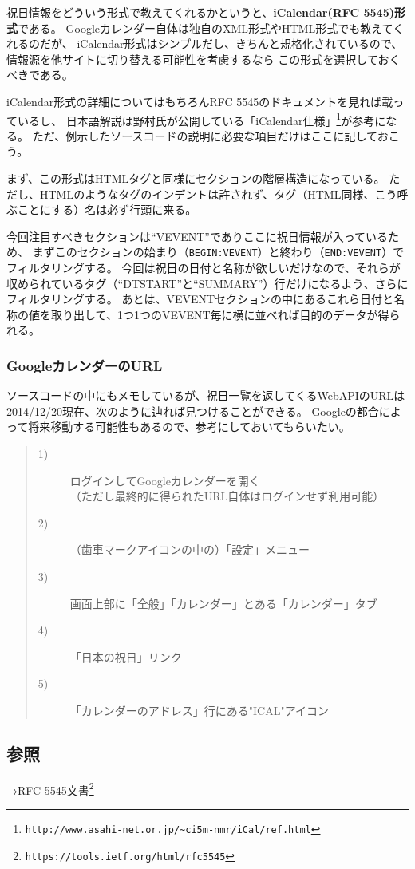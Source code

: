 祝日情報をどういう形式で教えてくれるかというと、\textbf{iCalendar(RFC 5545)形式}である。
Googleカレンダー自体は独自のXML形式やHTML形式でも教えてくれるのだが、
iCalendar形式はシンプルだし、きちんと規格化されているので、情報源を他サイトに切り替える可能性を考慮するなら
この形式を選択しておくべきである。

iCalendar形式の詳細についてはもちろんRFC 5545のドキュメントを見れば載っているし、
日本語解説は野村氏が公開している「iCalendar仕様」\footnote{\verb|http://www.asahi-net.or.jp/~ci5m-nmr/iCal/ref.html|}が参考になる。
ただ、例示したソースコードの説明に必要な項目だけはここに記しておこう。

まず、この形式はHTMLタグと同様にセクションの階層構造になっている。
ただし、HTMLのようなタグのインデントは許されず、タグ（HTML同様、こう呼ぶことにする）名は必ず行頭に来る。

今回注目すべきセクションは``VEVENT''でありここに祝日情報が入っているため、
まずこのセクションの始まり（\verb|BEGIN:VEVENT|）と終わり（\verb|END:VEVENT|）でフィルタリングする。
今回は祝日の日付と名称が欲しいだけなので、それらが収められているタグ（``DTSTART''と``SUMMARY''）行だけになるよう、さらにフィルタリングする。
あとは、VEVENTセクションの中にあるこれら日付と名称の値を取り出して、1つ1つのVEVENT毎に横に並べれば目的のデータが得られる。
\subsubsection*{GoogleカレンダーのURL}

ソースコードの中にもメモしているが、祝日一覧を返してくるWebAPIのURLは2014/12/20現在、次のように辿れば見つけることができる。
Googleの都合によって将来移動する可能性もあるので、参考にしておいてもらいたい。

\begin{quote}
\begin{description}
  \item[1)] ログインしてGoogleカレンダーを開く \\ （ただし最終的に得られたURL自体はログインせず利用可能）
  \item[2)] （歯車マークアイコンの中の）「設定」メニュー
  \item[3)] 画面上部に「全般」「カレンダー」とある「カレンダー」タブ
  \item[4)] 「日本の祝日」リンク
  \item[5)] 「カレンダーのアドレス」行にある"ICAL"アイコン
\end{description}
\end{quote}

\subsection*{参照}

\noindent
→RFC 5545文書\footnote{\verb|https://tools.ietf.org/html/rfc5545|}